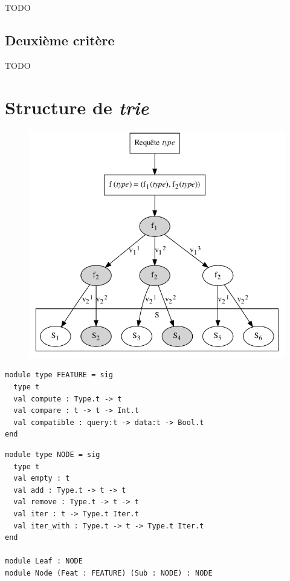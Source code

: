 \documentclass[a4paper]{report}
\theoremstyle{definition}
\newcommand{\trie}{\textit{trie}\xspace}
\begin{document}
TODO


\subsection{Deuxième critère}

TODO


\section{Structure de \trie}

\begin{figure}[h]
\begin{center}
	\includegraphics[scale=0.3]{graphs/trie}
\end{center}
\end{figure}

\begin{verbatim}
module type FEATURE = sig
  type t
  val compute : Type.t -> t
  val compare : t -> t -> Int.t
  val compatible : query:t -> data:t -> Bool.t
end
\end{verbatim}

\begin{verbatim}
module type NODE = sig
  type t
  val empty : t
  val add : Type.t -> t -> t
  val remove : Type.t -> t -> t
  val iter : t -> Type.t Iter.t
  val iter_with : Type.t -> t -> Type.t Iter.t
end

module Leaf : NODE
module Node (Feat : FEATURE) (Sub : NODE) : NODE
\end{verbatim}
\end{document}
